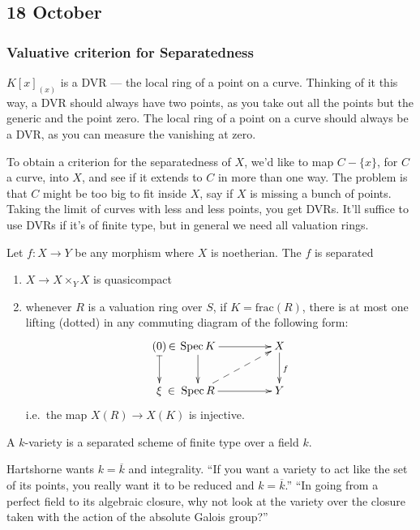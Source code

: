 \documentclass[11pt]{article}
\begin{document}
\begin{Oct18}
\section*{18 October}
\subsubsection*{Valuative criterion for Separatedness}
$K[x]_{(x)}$ is a DVR --- the local ring of a point on a curve. Thinking of it this way, a DVR should always have two points, as you take out all the points but the generic and the point zero. The local ring of a point on a curve should always be a DVR, as you can measure the vanishing at zero.

To obtain a criterion for the separatedness of $X$, we'd like to map $C-\{x\}$, for $C$ a curve, into $X$, and see if it extends to $C$ in more than one way. The problem is that $C$ might be too big to fit inside $X$, say if $X$ is missing a bunch of points. Taking the limit of curves with less and less points, you get DVRs. It'll suffice to use DVRs if it's of finite type, but in general we need all valuation rings.

\begin{thm*}
Let $f:X\to Y$ be
any morphism where $X$ is noetherian. The $f$ is separated \Iff
\begin{enumerate}\squishlist
\item $X\to X\times_Y X$ is quasicompact
\item whenever $R$ is a valuation ring over $S$, if $K=\text{frac}(R)$, there is at most one lifting (dotted) in any commuting
diagram of the following form:
\[\xymatrix@C=0cm{
(0)\,\makebox[-.05cm][l]{$\in$}\ar@{|->}[d]&&\Spec K\ar[rr]\ar[d]&
\qquad \qquad &X\ar[d]^f\\
\xi\,\makebox[-.05cm][l]{\,\,$\in$}&&\Spec R\ar[rr]\ar@{-->}[rru]&&Y
}\]
i.e.\ the map $X(R)\to X(K)$ is injective.
\end{enumerate}
\end{thm*}
\begin{defn*}
A $k$-variety is a separated scheme of finite type over a field $k$.
\end{defn*}
\noindent Hartshorne wants $k=\overline k$ and integrality. ``If you want a variety to act like the set of its points, you really want it to be reduced and $k=\overline k$.'' ``In going from a perfect field to its algebraic closure, why not look at the variety over the closure taken with the action of the absolute Galois group?''

\end{Oct18}
\end{document}
